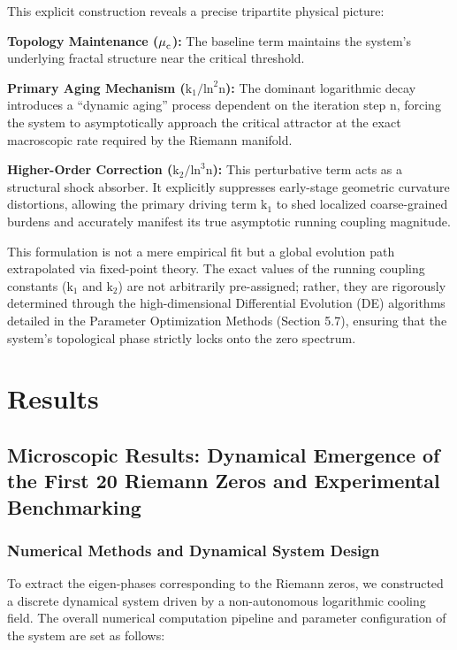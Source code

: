 \documentclass[fleqn,10pt]{wlscirep}
\begin{document}
This explicit construction reveals a precise tripartite physical
picture:

\textbf{Topology Maintenance (}\(\text{\ensuremath{\mu}}_{\text{c}}\)\textbf{):} The
baseline term maintains the system's underlying fractal structure near
the critical threshold.

\textbf{Primary Aging Mechanism
(}\(\text{k}_{\text{1}}\text{/}\text{ln}^{\text{2}}\text{n}\)\textbf{):}
The dominant logarithmic decay introduces a ``dynamic aging'' process
dependent on the iteration step \(\text{n}\), forcing the system to
asymptotically approach the critical attractor at the exact macroscopic
rate required by the Riemann manifold.

\textbf{Higher-Order Correction
(}\(\text{k}_{\text{2}}\text{/}\text{ln}^{\text{3}}\text{n}\)\textbf{):}
This perturbative term acts as a structural shock absorber. It
explicitly suppresses early-stage geometric curvature distortions,
allowing the primary driving term \(\text{k}_{\text{1}}\) to shed
localized coarse-grained burdens and accurately manifest its true
asymptotic running coupling magnitude.

This formulation is not a mere empirical fit but a global evolution path
extrapolated via fixed-point theory. The exact values of the running
coupling constants (\(\text{k}_{\text{1}}\) and \(\text{k}_{\text{2}}\))
are not arbitrarily pre-assigned; rather, they are rigorously determined
through the high-dimensional Differential Evolution (DE) algorithms
detailed in the Parameter Optimization Methods (Section 5.7), ensuring
that the system's topological phase strictly locks onto the zero
spectrum.

\section*{Results}

\subsection*{Microscopic Results: Dynamical Emergence of the First 20 Riemann Zeros and Experimental Benchmarking}

\subsubsection*{Numerical Methods and Dynamical System Design}

To extract the eigen-phases corresponding to the Riemann zeros, we
constructed a discrete dynamical system driven by a non-autonomous
logarithmic cooling field. The overall numerical computation pipeline
and parameter configuration of the system are set as follows:
\end{document}
